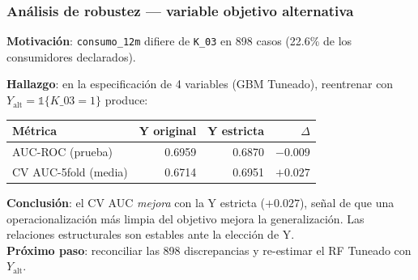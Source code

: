 \begin{frame}
\frametitle{Análisis de robustez — variable objetivo alternativa}
\small
\textbf{Motivación}: \texttt{consumo\_12m} difiere de \texttt{K\_03} en 898 casos (22.6\% de los consumidores declarados).

\vspace{0.2cm}
\textbf{Hallazgo}: en la especificación de 4 variables (GBM Tuneado), reentrenar con $Y_{\text{alt}} = \mathbb{1}\{K\_03 = 1\}$ produce:

\vspace{0.2cm}
\centering
\footnotesize
\begin{tabular}{lrrr}
\toprule
Métrica & Y original & Y estricta & $\Delta$ \\
\midrule
AUC-ROC (prueba)      & 0.6959 & 0.6870 & $-0.009$ \\
CV AUC-5fold (media)  & 0.6714 & 0.6951 & $+0.027$ \\
\bottomrule
\end{tabular}

\vspace{0.25cm}
\flushleft
\scriptsize
\textbf{Conclusión}: el CV AUC \textit{mejora} con la Y estricta ($+0.027$), señal de que una operacionalización más limpia del objetivo mejora la generalización. Las relaciones estructurales son estables ante la elección de Y.\\
\textbf{Próximo paso}: reconciliar las 898 discrepancias y re-estimar el RF Tuneado con $Y_{\text{alt}}$.
\end{frame}
